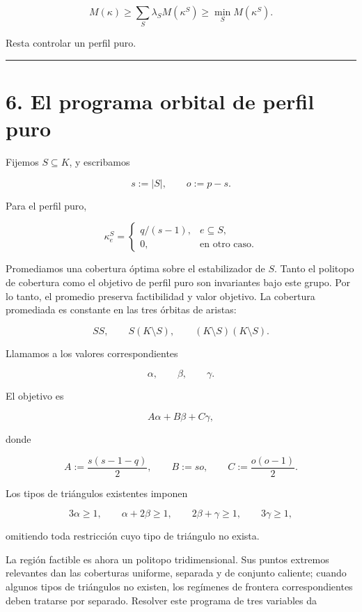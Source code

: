 \documentclass[
  11pt,
]{article}
\begin{document}
\[
\boxed{
M(\kappa)
\ge
\sum_S\lambda_SM(\kappa^S)
\ge
\min_SM(\kappa^S).
}
\tag{5.4}
\]

Resta controlar un perfil puro.

\begin{center}\rule{0.5\linewidth}{0.5pt}\end{center}

\section{6. El programa orbital de perfil
puro}\label{el-programa-orbital-de-perfil-puro}

Fijemos \(S\subseteq K\), y escribamos

\[
s:=|S|,
\qquad
o:=p-s.
\]

Para el perfil puro,

\[
\kappa_e^S
=
\begin{cases}
q/(s-1),&e\subseteq S,\\
0,&\text{en otro caso}.
\end{cases}
\tag{6.1}
\]

Promediamos una cobertura óptima sobre el estabilizador de \(S\). Tanto
el politopo de cobertura como el objetivo de perfil puro son invariantes
bajo este grupo. Por lo tanto, el promedio preserva factibilidad y valor
objetivo. La cobertura promediada es constante en las tres órbitas de
aristas:

\[
SS,\qquad
S(K\setminus S),\qquad
(K\setminus S)(K\setminus S).
\]

Llamamos a los valores correspondientes

\[
\alpha,\qquad\beta,\qquad\gamma.
\]

El objetivo es

\[
A\alpha+B\beta+C\gamma,
\tag{6.2}
\]

donde

\[
A:=\frac{s(s-1-q)}2,
\qquad
B:=so,
\qquad
C:=\frac{o(o-1)}2.
\tag{6.3}
\]

Los tipos de triángulos existentes imponen

\[
3\alpha\ge1,
\qquad
\alpha+2\beta\ge1,
\qquad
2\beta+\gamma\ge1,
\qquad
3\gamma\ge1,
\tag{6.4}
\]

omitiendo toda restricción cuyo tipo de triángulo no exista.

La región factible es ahora un politopo tridimensional. Sus puntos
extremos relevantes dan las coberturas uniforme, separada y de conjunto
caliente; cuando algunos tipos de triángulos no existen, los regímenes
de frontera correspondientes deben tratarse por separado. Resolver este
programa de tres variables da
\end{document}
